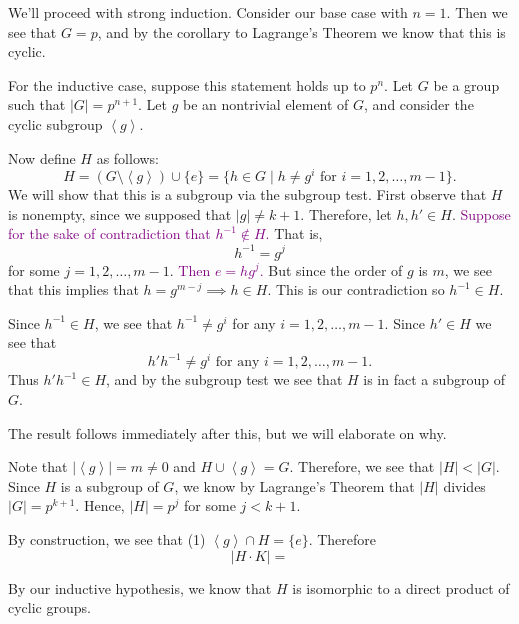 \documentclass[12pt,letterpaper]{algebra_book}
\theoremstyle{definition}
\begin{document}
    \begin{prf}
        \textcolor{NavyBlue}{We'll proceed with strong induction.}
        Consider our base case with $n = 1$. Then we see that $G = p$,
        and by the corollary to Lagrange's Theorem we know that this is
        cyclic. 

        For the inductive case, suppose this statement holds up to
        $p^n$. Let $G$ be a group such that $|G| = p^{n+1}$. Let $g$
        be an nontrivial element of $G$, and consider the cyclic
        subgroup $\left< g \right>$.
        
        


    
        Now define $H$ as follows:
        \[
            H = (G\setminus\left< g\right>) \cup \{e\} = \{h \in G \mid h \ne g^i \text{ for } i = 1, 2, \dots, m-1\}.  
        \]
        We will show that this is a subgroup via the subgroup test. 
        First
        observe that $H$ is nonempty, since we supposed that $|g| \ne
        k+1$. Therefore, let $h, h' \in H$. \textcolor{purple}{Suppose
        for the sake of contradiction that $h^{-1} \not\in H$.} That
        is, 
        \[
            h^{-1} = g^{j} 
        \]
        for some $j = 1, 2, \dots, m-1$. \textcolor{purple}{Then
        $e  = hg^{j}$.} But since the order of $g$ is $m$, we see that
        this implies that $h = g^{m - j} \implies h \in H$. This is
        our contradiction so $h^{-1} \in H$. 
        
        Since $h^{-1} \in H$, we see that $h^{-1} \ne g^i$ for any $i
        = 1, 2, \dots, m-1$. Since $h' \in H$ we see that 
        \[
            h'h^{-1} \ne g^{i} \text{ for any } i = 1, 2, \dots, m-1.
        \]
        Thus $h'h^{-1} \in H$, and by the subgroup test we see that
        $H$ is in fact a subgroup of $G$. 

        \textcolor{NavyBlue}{The result follows immediately after this, but we will elaborate on why. }
        
        Note that $|\left< g\right>| = m \ne 0$ and $H \cup \left<g \right>
        = G$. Therefore, we see that $|H| < |G|$. Since $H$ is a
        subgroup of $G$, we know by Lagrange's Theorem that $|H|$
        divides $|G| = p^{k+1}$. Hence, $|H| = p^j$ for some $j <
        k+1$.
        
        By construction, we see that (1) $\left< g \right> \cap H =
        \{e\}$. Therefore 
        \[
            |H \cdot K| =   
        \]

        By our inductive hypothesis, we know that $H$ is isomorphic to
        a direct product of cyclic groups. 

    \end{prf}
\end{document}
